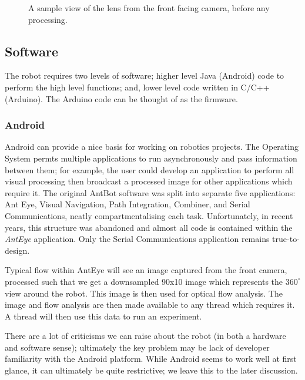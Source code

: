 \documentclass[a4paper,11pt,twoside,openright]{article}
\begin{document}
\begin{figure}[t!]
\begin{minipage}[t!]{0.45\textwidth}
    \caption{A sample view of the lens from the front facing camera, before any
      processing.}
  \end{minipage}

\end{figure}

\subsection{ Software }
The robot requires two levels of software; higher level Java (Android) code to
perform the high level functions; and, lower level code written in C/C++
(Arduino). The Arduino code can be thought of as the firmware.

\subsubsection{ Android } \label{subsubsec:droid}
Android can provide a nice basis for working on robotics projects. The
Operating System permts multiple applications to run asynchronously and
pass information between them; for example, the user could develop an application
to perform all visual processing then broadcast a processed image for other
applications which require it. The original AntBot software was split into
separate five applications: Ant Eye, Visual Navigation, Path Integration,
Combiner, and Serial Communications, neatly compartmentalising each task.
Unfortunately, in recent years, this structure was abandoned and almost all code
is contained within the \textit{AntEye} application. Only the Serial
Communications application remains true-to-design.
\newline
\par

Typical flow within AntEye will see an image captured from the front camera,
processed such that we get a downsampled 90x10 image which represents the
$360^{\circ}$ view around the robot. This image is then used for optical
flow analysis. The image and flow analysis are then made available to any thread
which requires it. A thread will then use this data to run an experiment.
\newline
\par

There are a lot of criticisms we can raise about the robot (in both a hardware
and software sense); ultimately the key problem may be lack of developer
familiarity with the Android platform.  While Android seems to work well at
first glance, it can ultimately be quite restrictive; we leave this to the
later discussion.
\end{document}
